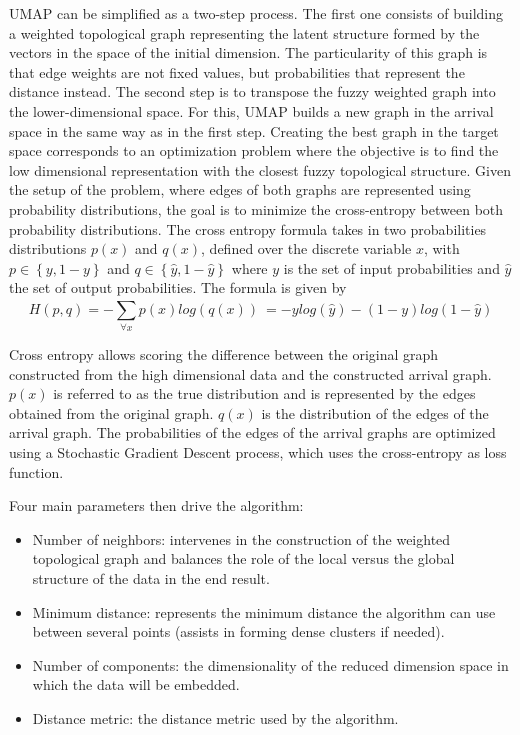 UMAP can be simplified as a two-step process.
The first one consists of building a weighted topological graph representing the latent structure formed by the vectors in the space of the initial dimension.
The particularity of this graph is that edge weights are not fixed values, but probabilities
that represent the distance instead.
The second step is to transpose the fuzzy weighted graph into the lower-dimensional space.
For this, UMAP builds a new graph in the arrival space in the same way as in the first step.
Creating the best graph in the target space corresponds to an optimization problem where the objective is to find the low dimensional representation with the closest fuzzy topological structure.
Given the setup of the problem, where edges of both graphs are represented using probability distributions, the goal is to minimize the cross-entropy between both probability distributions.
The cross entropy formula takes in two probabilities distributions \(p(x)\) and \(q(x)\),
defined over the discrete variable \(x\), with \( p \in \left\{y,1-y\right\}\) and \( q \in \left\{\hat{y},1-\hat{y}\right\}\)
where \(y\) is the set of input probabilities and \(\hat{y}\) the set of output probabilities.
The formula is given by
\[H(p,q)=-\sum_{\forall x}^{} p\left(x\right) log\left(q\left(x\right) \right)\ = -y log\left(\hat{y}\right) - \left(1-y\right) log\left(1 - \hat{y}\right)\]

Cross entropy allows scoring the difference between the original graph
constructed from the high dimensional data and the constructed arrival graph.
\(p(x)\) is referred to as the true distribution and is represented by the edges obtained from
the original graph.
\(q(x)\) is the distribution of the edges of the arrival graph.
The probabilities of the edges of the arrival graphs are optimized using a Stochastic
Gradient Descent process, which uses the cross-entropy as loss function.

Four main parameters then drive the algorithm:

\begin{itemize}
    \item Number of neighbors: intervenes in the construction of the weighted topological graph and balances the role of the local versus the global structure of the data in the end result.
    \item Minimum distance: represents the minimum distance the algorithm can use between several points (assists in forming dense clusters if needed).
    \item Number of components: the dimensionality of the reduced dimension space in which the data will be embedded.
    \item Distance metric: the distance metric used by the algorithm.
\end{itemize}

